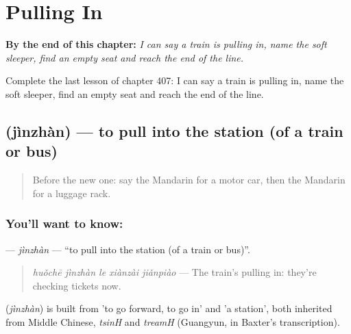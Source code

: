 
\chapter{Pulling In}
\label{ch:zh-pulling-in}

\begin{chapteropening}
\textbf{By the end of this chapter:} \emph{I can say a train is pulling in, name the soft sleeper, find an empty seat and reach the end of the line.}

Complete the last lesson of chapter 407: I can say a train is pulling in, name the soft sleeper, find an empty seat and reach the end of the line.
\end{chapteropening}

\section[\texorpdfstring{\zh{进站} (jìnzhàn)}{进站 (jìnzhàn)}]{ (jìnzhàn) — to pull into the station (of a train or bus)}

\label{lesson:ZH-C407-jinzhan}



\begin{quote}
Before the new one: say the Mandarin for a motor car, then the Mandarin for a luggage rack.
\end{quote}

\subsection*{You'll want to know: }
\textbf{} — \emph{jìnzhàn} — \textquotedblleft{}to pull into the station (of a train or bus)\textquotedblright{}.

\begin{quote}
\textbf{} \emph{huǒchē jìnzhàn le xiànzài jiǎnpiào} — The train's pulling in: they're checking tickets now.
\end{quote}

\begin{cousinweb}
\textbf{} (\emph{jìnzhàn}) is built from  'to go forward, to go in' and  'a station', both inherited from Middle Chinese, \emph{tsinH} and \emph{treamH} (Guangyun, in Baxter's transcription).
\end{cousinweb}

